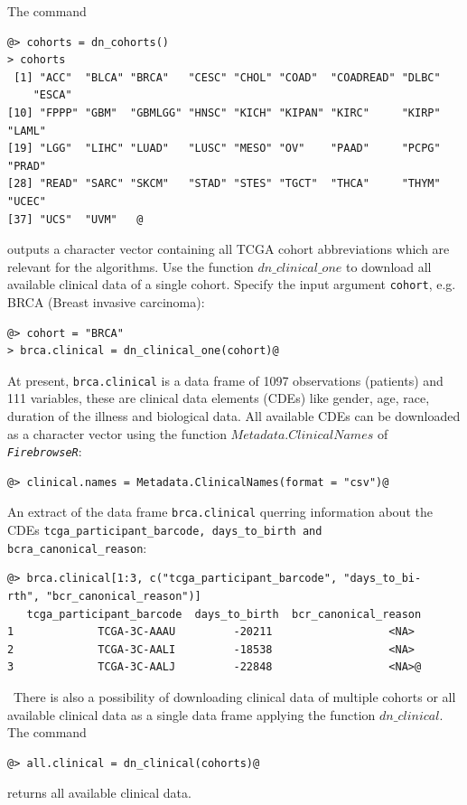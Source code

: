 \documentclass{TechReport}
\begin{document}
The command
\begin{lstlisting}[style=base]
@> cohorts = dn_cohorts()
> cohorts
 [1] "ACC"  "BLCA" "BRCA"   "CESC" "CHOL" "COAD"  "COADREAD" "DLBC"  
    "ESCA"    
[10] "FPPP" "GBM"  "GBMLGG" "HNSC" "KICH" "KIPAN" "KIRC"     "KIRP"  "LAML"    
[19] "LGG"  "LIHC" "LUAD"   "LUSC" "MESO" "OV"    "PAAD"     "PCPG"  "PRAD"    
[28] "READ" "SARC" "SKCM"   "STAD" "STES" "TGCT"  "THCA"     "THYM"  "UCEC"    
[37] "UCS"  "UVM"   @
\end{lstlisting}
outputs a character vector containing all TCGA cohort abbreviations
which are relevant for the algorithms. Use the function
$dn\_clinical\_one$ to download all available clinical data of a
single cohort. Specify the input argument {\tt cohort}, e.g. BRCA
(Breast invasive carcinoma):
\begin{lstlisting}[style=base]
@> cohort = "BRCA"
> brca.clinical = dn_clinical_one(cohort)@
\end{lstlisting}
At present, {\tt brca.clinical} is a data frame of 1097 observations (patients)
and 111 variables, these are clinical data elements (CDEs) like 
gender, age, race, duration of the illness and biological data. All available CDEs
can be downloaded as a character vector using the 
function $Metadata.ClinicalNames$ of \texttt{\em FirebrowseR}:
\begin{lstlisting}[style=base]
@> clinical.names = Metadata.ClinicalNames(format = "csv")@
\end{lstlisting}
An extract of the data frame {\tt brca.clinical} querring information about the CDEs
{\tt tcga\_participant\_barcode, days\_to\_birth and bcra\_canonical\_reason}:
\begin{lstlisting}[style=base]
@> brca.clinical[1:3, c("tcga_participant_barcode", "days_to_bi-
rth", "bcr_canonical_reason")]
   tcga_participant_barcode  days_to_birth  bcr_canonical_reason
1             TCGA-3C-AAAU         -20211                  <NA>
2             TCGA-3C-AALI         -18538                  <NA>
3             TCGA-3C-AALJ         -22848                  <NA>@
\end{lstlisting}
\ 
There is also a possibility of downloading clinical data of multiple cohorts or all
available clinical data as a single data frame
applying the function $dn\_clinical$. The command
\begin{lstlisting}[style=base]
@> all.clinical = dn_clinical(cohorts)@
\end{lstlisting}
returns all available clinical data.
\end{document}
